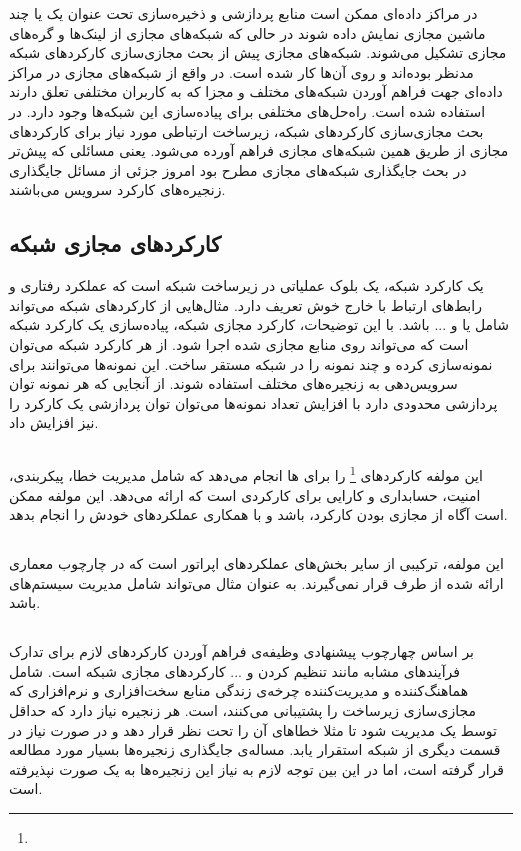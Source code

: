در مراکز داده‌ای ممکن است منابع پردازشی و ذخیره‌سازی تحت عنوان یک یا چند
ماشین مجازی نمایش داده شوند در حالی که شبکه‌های مجازی از لینک‌ها و گره‌های مجازی تشکیل می‌شوند.
شبکه‌های مجازی پیش از بحث مجازی‌سازی کارکردهای شبکه مدنظر بوده‌اند و روی آن‌ها کار شده است.
در واقع از شبکه‌های مجازی در مراکز داده‌ای جهت فراهم آوردن شبکه‌های مختلف و مجزا که به کاربران مختلفی تعلق دارند
استفاده شده است. راه‌حل‌های مختلفی برای پیاده‌سازی این شبکه‌ها وجود دارد. در بحث مجازی‌سازی کارکردهای شبکه‌، زیرساخت ارتباطی
مورد نیاز 
برای کارکردهای مجازی از طریق همین شبکه‌های مجازی فراهم آورده می‌شود.
یعنی مسائلی که پیش‌تر در بحث جایگذاری شبکه‌های مجازی مطرح بود
امروز جزئی از مسائل جایگذاری زنجیره‌های کارکرد سرویس می‌باشند.

\subsection{کارکردهای مجازی شبکه}
یک کارکرد شبکه، یک بلوک عملیاتی در زیرساخت شبکه است که عملکرد رفتاری و رابط‌های ارتباط با خارج خوش تعریف دارد.
مثال‌هایی از کارکردهای شبکه می‌تواند شامل
یا
و ... باشد.
با این توضیحات، کارکرد مجازی شبکه، پیاده‌سازی یک کارکرد شبکه است
که می‌تواند روی منابع مجازی شده اجرا شود.
از هر کارکرد شبکه می‌توان نمونه‌سازی کرده و چند نمونه را در شبکه مستقر ساخت. 
این نمونه‌ها می‌توانند برای سرویس‌دهی به زنجیره‌های مختلف استفاده شوند. از آنجایی که 
هر نمونه توان پردازشی محدودی دارد با افزایش تعداد نمونه‌ها می‌توان توان پردازشی یک کارکرد را نیز افزایش داد.

\subsection{}
این مولفه کارکردهای \footnote{} را برای  ها انجام می‌دهد که شامل مدیریت خطا، پیکربندی، امنیت، حسابداری و کارایی برای کارکردی است که  ارائه می‌دهد. این مولفه ممکن است آگاه از مجازی بودن کارکرد، باشد و با همکاری  عملکردهای خودش را انجام بدهد.

\subsection{}
این مولفه، ترکیبی از سایر بخش‌های عملکردهای اپراتور است که در چارچوب معماری  ارائه شده از طرف  قرار نمی‌گیرند. به عنوان مثال می‌تواند شامل مدیریت سیستم‌های  باشد.

\subsection{}
بر اساس چهارچوب پیشنهادی 
وظیفه‌ی  فراهم آوردن کارکردهای لازم
برای تدارک فرآیند‌های مشابه مانند تنظیم کردن و ... کارکردهای مجازی شبکه است.
 شامل هماهنگ‌کننده و مدیریت‌کننده چرخه‌ی زندگی
منابع سخت‌افزاری و نرم‌افزاری که مجازی‌سازی زیرساخت را پشتیبانی می‌کنند، است.
هر زنجیره نیاز دارد که حداقل توسط یک  مدیریت شود
تا مثلا خطاهای آن را تحت نظر قرار دهد و در صورت نیاز در قسمت دیگری از شبکه استقرار یابد.
مساله‌ی جایگذاری زنجیره‌ها بسیار مورد مطالعه قرار گرفته است، اما در این بین توجه لازم به نیاز این زنجیره‌ها به یک
صورت نپذیرفته است.

